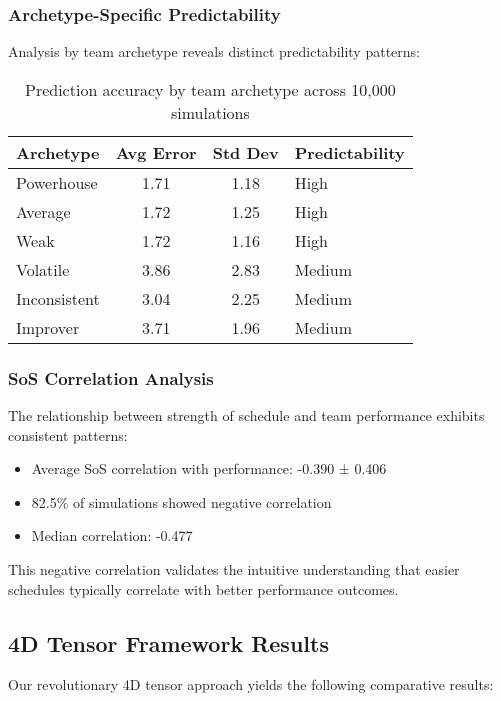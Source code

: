 \documentclass[11pt]{article}
\begin{document}
\subsubsection{Archetype-Specific Predictability}

Analysis by team archetype reveals distinct predictability patterns:

\begin{table}[H]
\centering
\begin{tabular}{lccl}
\toprule
Archetype & Avg Error & Std Dev & Predictability \\
\midrule
Powerhouse & 1.71 & 1.18 & High \\
Average & 1.72 & 1.25 & High \\
Weak & 1.72 & 1.16 & High \\
Volatile & 3.86 & 2.83 & Medium \\
Inconsistent & 3.04 & 2.25 & Medium \\
Improver & 3.71 & 1.96 & Medium \\
\bottomrule
\end{tabular}
\caption{Prediction accuracy by team archetype across 10,000 simulations}
\label{tab:archetype_results}
\end{table}

\subsubsection{SoS Correlation Analysis}

The relationship between strength of schedule and team performance exhibits consistent patterns:
\begin{itemize}
    \item Average SoS correlation with performance: -0.390 ± 0.406
    \item 82.5\% of simulations showed negative correlation
    \item Median correlation: -0.477
\end{itemize}

This negative correlation validates the intuitive understanding that easier schedules typically correlate with better performance outcomes.

\subsection{4D Tensor Framework Results}

Our revolutionary 4D tensor approach yields the following comparative results:
\end{document}

